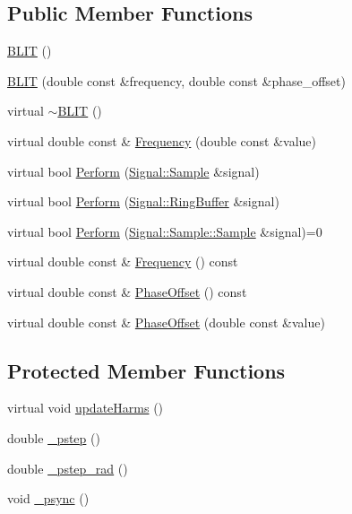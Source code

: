 \subsection*{Public Member Functions}
\begin{DoxyCompactItemize}
\item 
\hyperlink{classDSG_1_1BLIT_1_1BLIT_a41b824ce204aabfe5ba93c764317cd5d}{B\-L\-I\-T} ()
\item 
\hyperlink{classDSG_1_1BLIT_1_1BLIT_a78148b2e2d452205dba1c53510544f1f}{B\-L\-I\-T} (double const \&frequency, double const \&phase\-\_\-offset)
\item 
virtual \hyperlink{classDSG_1_1BLIT_1_1BLIT_a6dff49c2c1debfd2ccfe1070c4dfe914}{$\sim$\-B\-L\-I\-T} ()
\item 
virtual double const \& \hyperlink{classDSG_1_1BLIT_1_1BLIT_a9e25baaf286cc9c8407bbc5e343e3e7e}{Frequency} (double const \&value)
\item 
virtual bool \hyperlink{classDSG_1_1BLIT_1_1BLIT_a44e36ca4636ea045ba902efa1220b24b}{Perform} (\hyperlink{classDSG_1_1Signal_1_1Sample}{Signal\-::\-Sample} \&signal)
\item 
virtual bool \hyperlink{classDSG_1_1BLIT_1_1BLIT_a32e81f414a01f53124017cee9762341e}{Perform} (\hyperlink{classDSG_1_1Signal_1_1RingBuffer}{Signal\-::\-Ring\-Buffer} \&signal)
\item 
virtual bool \hyperlink{classDSG_1_1SignalProcess_ae8a803d175eca1ec5f34a52035a082b4}{Perform} (\hyperlink{classDSG_1_1Signal_1_1Sample_a21db6fade3ee3554ed3887cb2b74daff}{Signal\-::\-Sample\-::\-Sample} \&signal)=0
\item 
virtual double const \& \hyperlink{classDSG_1_1SignalGenerator_aedac746c5a70818d120858542ecb7c45}{Frequency} () const 
\item 
virtual double const \& \hyperlink{classDSG_1_1SignalGenerator_a1ce521847edd0b837fd840998f906b4b}{Phase\-Offset} () const 
\item 
virtual double const \& \hyperlink{classDSG_1_1SignalGenerator_a08b71b1f30ba65e629642c570291dc0e}{Phase\-Offset} (double const \&value)
\end{DoxyCompactItemize}
\subsection*{Protected Member Functions}
\begin{DoxyCompactItemize}
\item 
virtual void \hyperlink{classDSG_1_1BLIT_1_1BLIT_ab50b3ce86348b62f3c093d95cb5361d3}{update\-Harms} ()
\item 
double \hyperlink{classDSG_1_1SignalGenerator_ac0d781b8673b3a283bf7c133290ede50}{\-\_\-pstep} ()
\item 
double \hyperlink{classDSG_1_1SignalGenerator_ae660eb4caa88b8d278f8d24d0908a487}{\-\_\-pstep\-\_\-rad} ()
\item 
void \hyperlink{classDSG_1_1SignalGenerator_a05baccb38d1e52860d4fcf7cb8430efc}{\-\_\-psync} ()
\end{DoxyCompactItemize}
